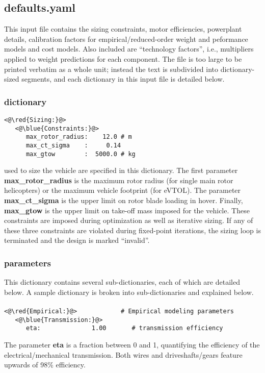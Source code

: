 \subsection{\textbf{defaults.yaml}}
This input file contains the sizing constraints, motor efficiencies, powerplant details, calibration factors for empirical/reduced-order weight and peformance models and cost models. Also included are ``technology factors'', i.e., multipliers applied to weight predictions for each component. The file is too large to be printed verbatim as a whole unit; instead the text is subdivided into dictionary-sized segments, and each dictionary in this input file is detailed below.

\subsubsection{ dictionary}
\begin{lstlisting}
<@\red{Sizing:}@>
   <@\blue{Constraints:}@>
      max_rotor_radius:    12.0 # m
      max_ct_sigma    :     0.14
      max_gtow        :  5000.0 # kg
\end{lstlisting}

 used to size the vehicle are specified in this dictionary. The first parameter \textbf{max\_rotor\_radius} is the maximum rotor radius (for single main rotor helicopters) or the maximum vehicle footprint (for eVTOL). The parameter \textbf{max\_ct\_sigma} is the upper limit on rotor blade loading in hover. Finally, \textbf{max\_gtow} is the upper limit on take-off mass imposed for the vehicle. These constraints are imposed during optimization as well as iterative sizing. If any of these three constraints are violated during fixed-point iterations, the sizing loop is terminated and the design is marked ``invalid''.

\subsubsection{ parameters}
This dictionary contains several sub-dictionaries, each of which are detailed below. A sample dictionary is broken into sub-dictionaries and explained below.

\paragraph{}
\begin{lstlisting}
<@\red{Empirical:}@> 			# Empirical modeling parameters
   <@\blue{Transmission:}@>
      eta:              1.00       # transmission efficiency
\end{lstlisting}
The parameter \textbf{eta} is a fraction between 0 and 1, quantifying the efficiency of the electrical/mechanical transmission. Both wires and driveshafts/gears feature upwards of 98\% efficiency.

